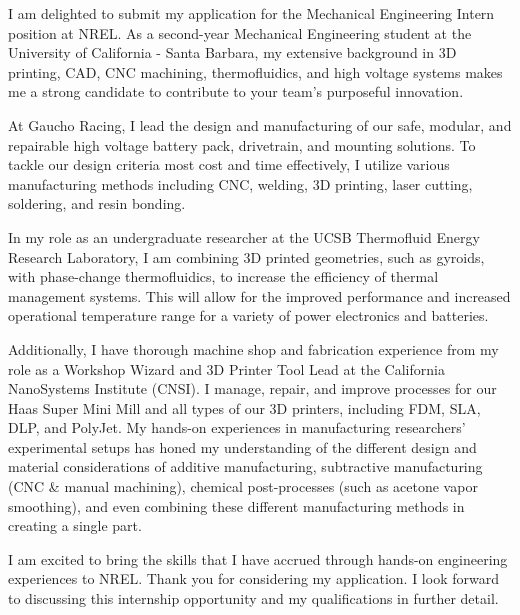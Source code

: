 \documentclass[11pt, letterpaper]{awesome-cv} %
\begin{document}
\makecvheader %

\makelettertitle %


\begin{cvletter}


I am delighted to submit my application for the Mechanical Engineering Intern position at NREL. As a second-year Mechanical Engineering student at the University of California - Santa Barbara, my extensive background in 3D printing, CAD, CNC machining, thermofluidics, and high voltage systems makes me a strong candidate to contribute to your team's purposeful innovation.

At Gaucho Racing, I lead the design and manufacturing of our safe, modular, and repairable high voltage battery pack, drivetrain, and mounting solutions. To tackle our design criteria most cost and time effectively, I utilize various manufacturing methods including CNC, welding, 3D printing, laser cutting, soldering, and resin bonding. 

In my role as an undergraduate researcher at the UCSB Thermofluid Energy Research Laboratory, I am combining 3D printed geometries, such as gyroids, with phase-change thermofluidics, to increase the efficiency of thermal management systems. This will allow for the improved performance and increased operational temperature range for a variety of power electronics and batteries.

Additionally, I have thorough machine shop and fabrication experience from my role as a Workshop Wizard and 3D Printer Tool Lead at the California NanoSystems Institute (CNSI). I manage, repair, and improve processes for our Haas Super Mini Mill and all types of our 3D printers, including FDM, SLA, DLP, and PolyJet. My hands-on experiences in manufacturing researchers' experimental setups has honed my understanding of the different design and material considerations of additive manufacturing, subtractive manufacturing (CNC \& manual machining), chemical post-processes (such as acetone vapor smoothing), and even combining these different manufacturing methods in creating a single part.

I am excited to bring the skills that I have accrued through hands-on engineering experiences to NREL. Thank you for considering my application. I look forward to discussing this internship opportunity and my qualifications in further detail.


\end{cvletter}


\makeletterclosing %
\end{document}
